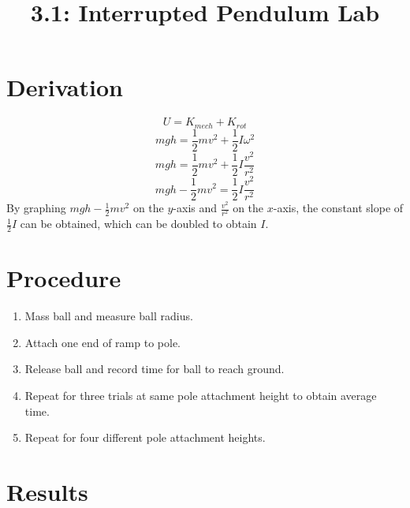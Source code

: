 \documentclass{article}
\title{3.1: Interrupted Pendulum Lab}
\begin{document}
\section{Derivation}
\[U = K_{mech} + K_{rot}\]
\[mgh = \frac{1}{2}mv^2 + \frac{1}{2}I\omega^2\]
\[mgh = \frac{1}{2}mv^2 + \frac{1}{2}I\frac{v^2}{r^2}\]
\[mgh - \frac{1}{2}mv^2 = \frac{1}{2}I\frac{v^2}{r^2}\]
By graphing $mgh - \frac{1}{2}mv^2$ on the $y$-axis and $\frac{v^2}{r^2}$ on the $x$-axis, the constant slope of $\frac{1}{2}I$ can be obtained, which can be doubled to obtain $I$.
\section{Procedure}
\begin{enumerate}
    \item Mass ball and measure ball radius.
    \item Attach one end of ramp to pole.
    \item Release ball and record time for ball to reach ground.
    \item Repeat for three trials at same pole attachment height to obtain average time.
    \item Repeat for four different pole attachment heights.
\end{enumerate}
\section{Results}
\end{document}
